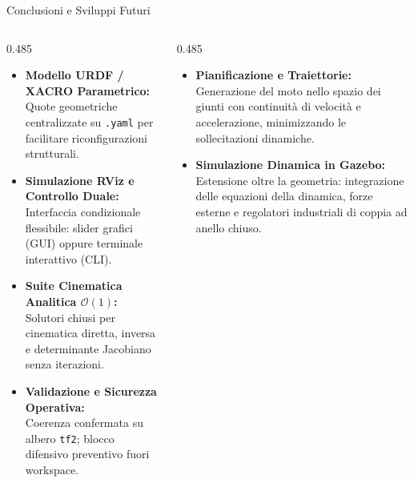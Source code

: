 \documentclass[aspectratio=169, 10pt]{beamer}
\begin{document}
\begin{frame}{Conclusioni e Sviluppi Futuri}
    \begin{columns}[onlytextwidth, T]
        \begin{column}{0.485\textwidth}
            \begin{tcolorbox}[moderncard, title={\color{UniPgNavy}Sintesi dei Risultati}, equal height group=concl_cards]
                \footnotesize
                \begin{itemize}
                    \setlength{\itemsep}{2.5pt}
                    \item \textbf{Modello URDF / XACRO Parametrico:}\\
                    Quote geometriche centralizzate su \texttt{.yaml} per facilitare riconfigurazioni strutturali.
                    \item \textbf{Simulazione RViz e Controllo Duale:}\\
                    Interfaccia condizionale flessibile: slider grafici (GUI) oppure terminale interattivo (CLI).
                    \item \textbf{Suite Cinematica Analitica $\mathcal{O}(1)$:}\\
                    Solutori chiusi per cinematica diretta, inversa e determinante Jacobiano senza iterazioni.
                    \item \textbf{Validazione e Sicurezza Operativa:}\\
                    Coerenza confermata su albero \texttt{tf2}; blocco difensivo preventivo fuori workspace.
                \end{itemize}
            \end{tcolorbox}
        \end{column}

        \begin{column}{0.485\textwidth}
            \begin{tcolorbox}[moderncard, title={\color{TechCyan}Prospettive di Sviluppo Futuro}, equal height group=concl_cards]
                \footnotesize
                \begin{itemize}
                    \setlength{\itemsep}{3.5pt}
                    \item \textbf{Pianificazione e Traiettorie:}\\
                    Generazione del moto nello spazio dei giunti con continuità di velocità e accelerazione, minimizzando le sollecitazioni dinamiche.
                    \item \textbf{Simulazione Dinamica in Gazebo:}\\
                    Estensione oltre la geometria: integrazione delle equazioni della dinamica, forze esterne e regolatori industriali di coppia ad anello chiuso.
                \end{itemize}
            \end{tcolorbox}
        \end{column}
    \end{columns}
\end{frame}
\end{document}
